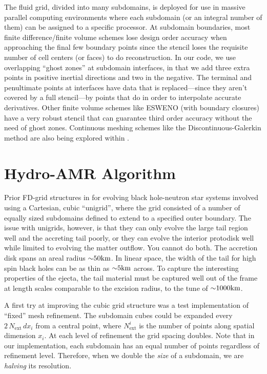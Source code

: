 The fluid grid, divided into many subdomains, is deployed for use in massive parallel computing environments where each subdomain (or an integral number of them) can be assigned to a specific processor. 
At subdomain boundaries, most finite difference/finite volume schemes lose design order accuracy when approaching the final few boundary points since the stencil loses the requisite number of cell centers (or faces) to do reconstruction.
In our code, we use overlapping ``ghost zones'' at subdomain interfaces, in that we add three extra points in positive inertial directions and two in the negative.
The terminal and penultimate points at interfaces have data that is  replaced---since they aren't covered by a full stencil---by points that do in order to interpolate accurate derivatives.
Other finite volume schemes like ESWENO (with boundary closures) have a very robust stencil that can guarantee third order accuracy without the need of ghost zones.  
Continuous meshing schemes like the Discontinuous-Galerkin method are also being explored within \SpEC.



\section{Hydro-AMR Algorithm}
\label{sec:hydro-amr}

Prior FD-grid structures in \SpEC for evolving black hole-neutron star systems involved using a Cartesian, cubic ``unigrid'', where the grid consisted of a number of equally sized subdomains defined to extend to a specified outer boundary.  
The issue with unigrids, however, is that they can only evolve the large tail region well and the accreting tail poorly, or they can evolve the interior protodisk well while limited to evolving the matter outflow.  You cannot do both.  
The accretion disk spans an areal radius $\mathord{\sim} 50 \textrm{km}$.  
In linear space, the width of the tail for high spin black holes can be as thin as $\mathord{\sim} 5 \textrm{km}$ across.  
To capture the interesting properties of the ejecta, the tail material must be captured well out of the frame at length scales comparable to the excision radius, to the tune of $\mathord{\sim} 1000 \textrm{km}$.

A first try at improving the cubic grid structure was a test implementation of ``fixed'' mesh refinement.  The subdomain cubes could be expanded every $2\,N_\textrm{ext}\,dx_i$ from a central point, where $N^i_\textrm{ext}$ is the number of points along spatial dimension $x_i$.  At each level of refinement the grid spacing doubles.  Note that in our implementation, each subdomain has an equal number of points regardless of refinement level.  Therefore, when we double the \textit{size} of a subdomain, we are \textit{halving} its resolution.

